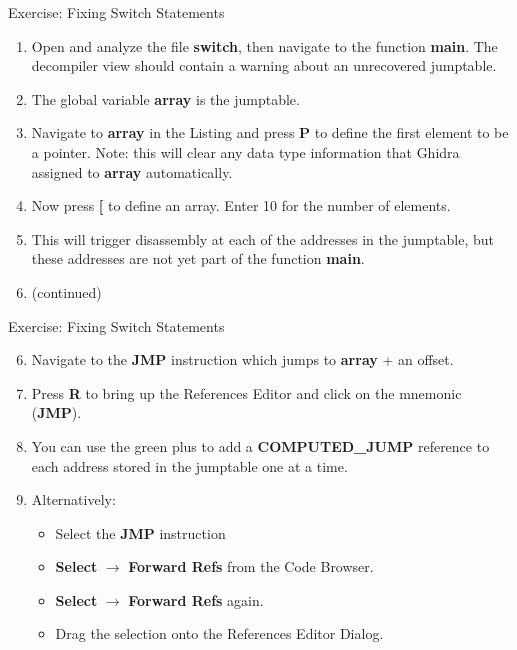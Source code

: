 \documentclass{beamer}
\begin{document}
\begin{frame}
\begin{block}{Exercise: Fixing Switch Statements}
\begin{enumerate}
\item Open and analyze the file \textbf{switch}, then navigate to the function \textbf{main}. The decompiler view should contain a warning about an unrecovered jumptable.
\item The global variable \textbf{array} is the jumptable. 
\item Navigate to \textbf{array} in the Listing and press \textbf{P} to define the first element to be a pointer.  Note: this will clear any data type information that Ghidra assigned to 
\textbf{array} automatically.
\item Now press \textbf{[} to define an array.  Enter 10 for the number of elements. 
\item This will trigger disassembly at each of the addresses in the jumptable, but these addresses are not yet part of the function \textbf{main}.
\item[] (continued)
\end{enumerate}
\end{block}
\end{frame}

\begin{frame}
\begin{block}{Exercise: Fixing Switch Statements}
\begin{enumerate}
\setcounter{enumi}{5}
\item Navigate to the \textbf{JMP} instruction which jumps to \textbf{array} + an offset.
\item Press \textbf{R} to bring up the References Editor and click on the mnemonic (\textbf{JMP}).
\item You can use the green plus to add a \textbf{COMPUTED\_JUMP} reference to each address stored in the jumptable one at a time.
\item Alternatively:
\begin{itemize}
\item Select the \textbf{JMP} instruction
\item \textbf{Select} $\rightarrow$ \textbf{Forward Refs} from the Code Browser.
\item \textbf{Select} $\rightarrow$ \textbf{Forward Refs} again.
\item Drag the selection onto the References Editor Dialog.
\end{itemize}
\end{enumerate}
\end{block}
\end{frame}
\end{document}
